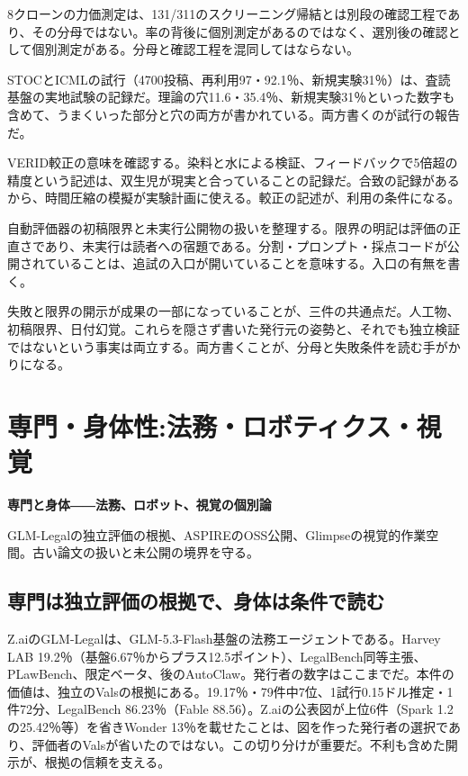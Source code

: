 \documentclass[lualatex,a4paper,10pt]{jlreq}
\begin{document}
8クローンの力価測定は、131/311のスクリーニング帰結とは別段の確認工程であり、その分母ではない。率の背後に個別測定があるのではなく、選別後の確認として個別測定がある。分母と確認工程を混同してはならない。
\cite{B43,B44,B45,B46}


STOCとICMLの試行（4700投稿、再利用97・92.1％、新規実験31％）は、査読基盤の実地試験の記録だ。理論の穴11.6・35.4％、新規実験31％といった数字も含めて、うまくいった部分と穴の両方が書かれている。両方書くのが試行の報告だ。
\cite{B49,B50}


VERID較正の意味を確認する。染料と水による検証、フィードバックで5倍超の精度という記述は、双生児が現実と合っていることの記録だ。合致の記録があるから、時間圧縮の模擬が実験計画に使える。較正の記述が、利用の条件になる。
\cite{B43,B44,B45,B46}


自動評価器の初稿限界と未実行公開物の扱いを整理する。限界の明記は評価の正直さであり、未実行は読者への宿題である。分割・プロンプト・採点コードが公開されていることは、追試の入口が開いていることを意味する。入口の有無を書く。
\cite{B47,B48}


失敗と限界の開示が成果の一部になっていることが、三件の共通点だ。人工物、初稿限界、日付幻覚。これらを隠さず書いた発行元の姿勢と、それでも独立検証ではないという事実は両立する。両方書くことが、分母と失敗条件を読む手がかりになる。
\cite{B49,B47,B50,B43,B48,B44,B45,B46}


\section{専門・身体性:法務・ロボティクス・視覚}
\label{sec:P7}

{\Large\bfseries 専門と身体――法務、ロボット、視覚の個別論\par}
\smallskip
{\color{SurveyMuted}GLM-Legalの独立評価の根拠、ASPIREのOSS公開、Glimpseの視覚的作業空間。古い論文の扱いと未公開の境界を守る。\par}
\bigskip

\subsection*{専門は独立評価の根拠で、身体は条件で読む}

Z.aiのGLM-Legalは、GLM-5.3-Flash基盤の法務エージェントである。Harvey LAB 19.2％（基盤6.67％からプラス12.5ポイント）、LegalBench同等主張、PLawBench、限定ベータ、後のAutoClaw。発行者の数字はここまでだ。本件の価値は、独立のValsの根拠にある。19.17％・79件中7位、1試行0.15ドル推定・1件72分、LegalBench 86.23％（Fable 88.56）。Z.aiの公表図が上位6件（Spark 1.2の25.42％等）を省きWonder 13％を載せたことは、図を作った発行者の選択であり、評価者のValsが省いたのではない。この切り分けが重要だ。不利も含めた開示が、根拠の信頼を支える。
\cite{B53,B54,B55}
\end{document}
